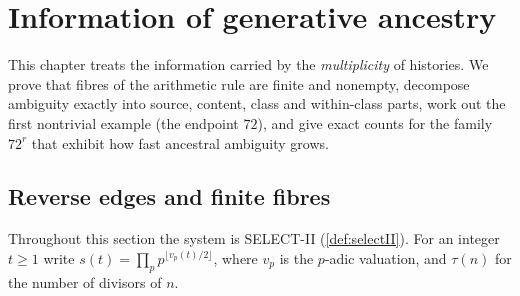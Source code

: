 \chapter{Information of generative ancestry}\label{ch:ancestry}

This chapter treats the information carried by the \emph{multiplicity} of histories. We prove that fibres of the arithmetic rule are finite and nonempty, decompose ambiguity exactly into source, content, class and within-class parts, work out the first nontrivial example (the endpoint $72$), and give exact counts for the family $72^r$ that exhibit how fast ancestral ambiguity grows.

\section{Reverse edges and finite fibres}
Throughout this section the system is SELECT-II (\cref{def:selectII}). For an integer $t\ge1$ write $s(t)=\prod_p p^{\lfloor v_p(t)/2\rfloor}$, where $v_p$ is the $p$-adic valuation, and $\tau(n)$ for the number of divisors of $n$.

